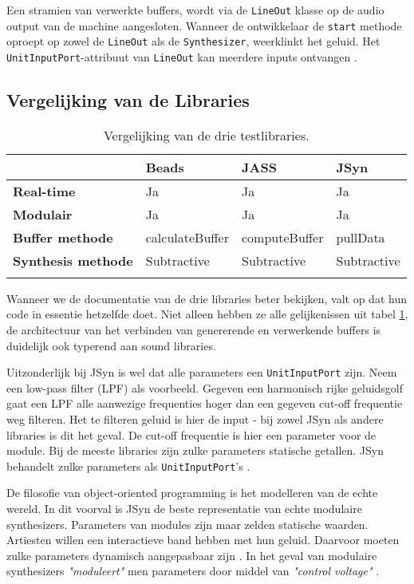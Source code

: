 Een stramien van verwerkte buffers, wordt via de \verb+LineOut+ klasse op de audio output van de machine aangesloten. Wanneer de ontwikkelaar de \verb+start+ methode oproept op zowel de \verb+LineOut+ als de \verb+Synthesizer+, weerklinkt het geluid. Het \verb+UnitInputPort+-attribuut van \verb+LineOut+ kan meerdere inputs ontvangen \autocite{jsyndocs}.

\subsection*{Vergelijking van de Libraries}

\begin{longtable}[c]{l|lll}
         & \textbf{Beads} & \textbf{JASS} & \textbf{JSyn} \\ \hline
        \textbf{Real-time} & Ja & Ja & Ja \\
        \textbf{Modulair} & Ja & Ja & Ja \\
        \textbf{Buffer methode} & calculateBuffer & computeBuffer & pullData \\
        \textbf{Synthesis methode} & Subtractive & Subtractive & Subtractive \\
    \caption{Vergelijking van de drie testlibraries.}
    \label{tab:vergelijking}
\end{longtable}

Wanneer we de documentatie van de drie libraries beter bekijken, valt op dat hun code in essentie hetzelfde doet. Niet alleen hebben ze alle gelijkenissen uit tabel \ref{tab:vergelijking}, de architectuur van het verbinden van genererende en verwerkende buffers is duidelijk ook typerend aan sound libraries.

Uitzonderlijk bij JSyn is wel dat alle parameters een \verb+UnitInputPort+ zijn. Neem een low-pass filter (LPF) als voorbeeld. Gegeven een harmonisch rijke geluidsgolf gaat een LPF alle aanwezige frequenties hoger dan een gegeven cut-off frequentie weg filteren. Het te filteren geluid is hier de input - bij zowel JSyn als andere libraries is dit het geval. De cut-off frequentie is hier een parameter voor de module.\newline
Bij de meeste libraries zijn zulke parameters statische getallen. JSyn behandelt zulke parameters als \verb+UnitInputPort+'s \autocite{jsyndocs}.

De filosofie van object-oriented programming is het modelleren van de echte wereld. In dit voorval is JSyn de beste representatie van echte modulaire synthesizers. Parameters van modules zijn maar zelden statische waarden. Artiesten willen een interactieve band hebben met hun geluid. Daarvoor moeten zulke parameters dynamisch aangepasbaar zijn \autocite{vagabundos}. In het geval van modulaire synthesizers \textit{"moduleert"} men parameters door middel van \textit{"control voltage"} \autocite{modular}.

